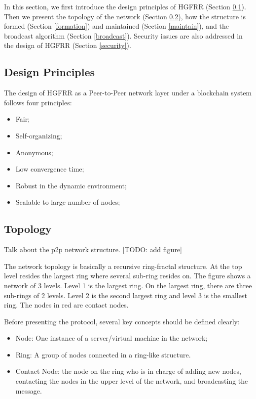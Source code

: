 In this section, we first introduce the design principles of HGFRR (Section \cref{principles}). Then we present the topology of the network (Section \cref{topo}), how the structure is formed (Section \cref{formation}) and maintained (Section \cref{maintain}), and the broadcast algorithm (Section \cref{broadcast}). Security issues are also addressed in the design of HGFRR (Section \cref{security}).

\subsection{Design Principles} \label{principles}

The design of HGFRR as a Peer-to-Peer network layer under a blockchain system follows four principles:
\begin{itemize}[noitemsep, topsep=0pt]
	\item Fair;
	\item Self-organizing;
	\item Anonymous;
	\item Low convergence time;
	\item Robust in the dynamic environment;
	\item Scalable to large number of nodes;
\end{itemize}

\subsection{Topology} \label{topo}

Talk about the p2p network structure. [TODO: add figure]

The network topology is basically a recursive ring-fractal structure. At the top level resides the largest ring where several sub-ring resides on. The figure shows a network of 3 levels. Level 1 is the largest ring. On the largest ring, there are three sub-rings of 2 levels. Level 2 is the second largest ring and level 3 is the smallest ring. The nodes in red are contact nodes.

Before presenting the protocol, several key concepts should be defined clearly:
\begin{itemize}[noitemsep, topsep=0pt]
	\item Node: One instance of a server/virtual machine in the network;
	\item Ring: A group of nodes connected in a ring-like structure.
	\item Contact Node: the node on the ring who is in charge of adding new nodes, contacting the nodes in the upper level of the network, and broadcasting the message.
\end{itemize}

